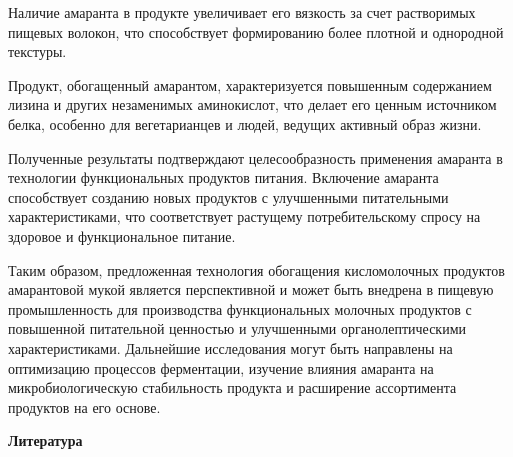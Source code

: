 \begin{multicols}{2}
Наличие амаранта в продукте увеличивает его вязкость за счет растворимых
пищевых волокон, что способствует формированию более плотной и
однородной текстуры.

Продукт, обогащенный амарантом, характеризуется повышенным содержанием
лизина и других незаменимых аминокислот, что делает его ценным
источником белка, особенно для вегетарианцев и людей, ведущих активный
образ жизни.

Полученные результаты подтверждают целесообразность применения амаранта
в технологии функциональных продуктов питания. Включение амаранта
способствует созданию новых продуктов с улучшенными питательными
характеристиками, что соответствует растущему потребительскому спросу на
здоровое и функциональное питание.

Таким образом, предложенная технология обогащения кисломолочных
продуктов амарантовой мукой является перспективной и может быть внедрена
в пищевую промышленность для производства функциональных молочных
продуктов с повышенной питательной ценностью и улучшенными
органолептическими характеристиками. Дальнейшие исследования могут быть
направлены на оптимизацию процессов ферментации, изучение влияния
амаранта на микробиологическую стабильность продукта и расширение
ассортимента продуктов на его основе.
\end{multicols}

\begin{center}
{\bfseries Литература}
\end{center}

